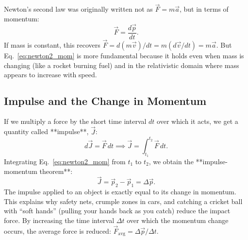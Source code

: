 Newton’s second law was originally written not as $\vec{F} = m\vec{a}$, but in terms of momentum:
\begin{equation}
    \vec{F} = \frac{d\vec{p}}{dt}. \label{eq:newton2_mom}
\end{equation}
If mass is constant, this recovers $\vec{F} = d(m\vec{v})/dt = m(d\vec{v}/dt) = m\vec{a}$. But Eq.~\eqref{eq:newton2_mom} is more fundamental because it holds even when mass is changing (like a rocket burning fuel) and in the relativistic domain where mass appears to increase with speed.

\subsection{Impulse and the Change in Momentum}

If we multiply a force by the short time interval $dt$ over which it acts, we get a quantity called **impulse**, $\vec{J}$:
\begin{equation}
    d\vec{J} = \vec{F}\,dt \implies \vec{J} = \int_{t_1}^{t_2} \vec{F}\,dt.
\end{equation}
Integrating Eq.~\eqref{eq:newton2_mom} from $t_1$ to $t_2$, we obtain the **impulse-momentum theorem**:
\begin{equation}
    \vec{J} = \vec{p}_2 - \vec{p}_1 = \Delta\vec{p}.
\end{equation}
The impulse applied to an object is exactly equal to its change in momentum. This explains why safety nets, crumple zones in cars, and catching a cricket ball with ``soft hands'' (pulling your hands back as you catch) reduce the impact force. By increasing the time interval $\Delta t$ over which the momentum change occurs, the average force is reduced: $\vec{F}_{\text{avg}} = \Delta\vec{p}/\Delta t$.

